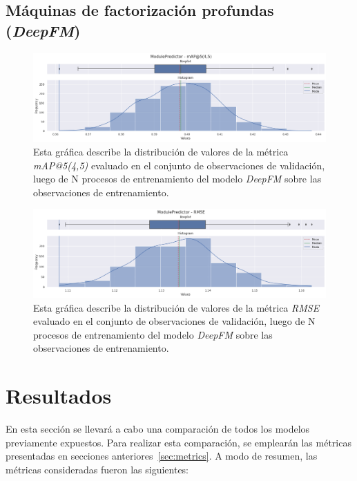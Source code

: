 \documentclass[11pt,a4paper,twoside]{thesis}
\begin{document}
\clearpage

\section{Máquinas de factorización profundas (\textit{DeepFM})}

\begin{figure}[h!]
	\centering
	\includegraphics[width=15cm]{./images/metrics-DeepFM-mapk.png}
	\caption{Esta gráfica describe la distribución de valores de la
		métrica \textit{mAP@5(4,5)} evaluado en el conjunto de
		observaciones de validación, luego de N procesos de
		entrenamiento del modelo \textit{DeepFM} sobre las observaciones
		de entrenamiento.}
\end{figure}

\begin{figure}[h!]
	\centering
	\includegraphics[width=15cm]{./images/metrics-DeepFM-RMSE.png}
	\caption{Esta gráfica describe la distribución de valores de la
		métrica \textit{RMSE} evaluado en el conjunto de observaciones
		de validación, luego de N procesos de entrenamiento del modelo
		\textit{DeepFM} sobre las observaciones de entrenamiento.}
\end{figure}

\chapter{Resultados}

En esta sección se llevará a cabo una comparación de todos los modelos
previamente expuestos. Para realizar esta comparación, se emplearán las
métricas presentadas en secciones anteriores~\autoref{sec:metrics}. A modo de
resumen, las métricas consideradas fueron las siguientes:
\end{document}
